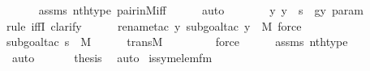 \begin{isabellebody}
\ \ \ \ \isamarkupfalse%
\ assms\ nth{\isacharunderscore}{\kern0pt}type\ pair{\isacharunderscore}{\kern0pt}in{\isacharunderscore}{\kern0pt}M{\isacharunderscore}{\kern0pt}iff\isanewline
\ \ \ \ \isamarkupfalse%
\ auto\isanewline
\ \ \isamarkupfalse%
\ \isamarkupfalse%
\ {\isachardoublequoteopen}{\isachardot}{\kern0pt}{\isachardot}{\kern0pt}{\isachardot}{\kern0pt}\ {\isasymlongleftrightarrow}\ {\isacharparenleft}{\kern0pt}{\isasymforall}y{\isachardot}{\kern0pt}\ y\ {\isasymin}\ s\ {\isasymlongrightarrow}\ g{\isacharbackquote}{\kern0pt}{\isacharless}{\kern0pt}y{\isacharcomma}{\kern0pt}\ param{\isachargreater}{\kern0pt}\ {\isacharequal}{\kern0pt}\ {}{\isacharparenright}{\kern0pt}{\isachardoublequoteclose}\ \isanewline
\ \ \ \ \isamarkupfalse%
{\isacharparenleft}{\kern0pt}rule\ iffI{\isacharcomma}{\kern0pt}\ clarify{\isacharparenright}{\kern0pt}\isanewline
\ \ \ \ \ \isamarkupfalse%
{\isacharparenleft}{\kern0pt}rename{\isacharunderscore}{\kern0pt}tac\ y{\isacharcomma}{\kern0pt}\ subgoal{\isacharunderscore}{\kern0pt}tac\ {\isachardoublequoteopen}y\ {\isasymin}\ M{\isachardoublequoteclose}{\isacharcomma}{\kern0pt}\ force{\isacharparenright}{\kern0pt}\isanewline
\ \ \ \ \ \isamarkupfalse%
{\isacharparenleft}{\kern0pt}subgoal{\isacharunderscore}{\kern0pt}tac\ {\isachardoublequoteopen}s\ {\isasymin}\ M{\isachardoublequoteclose}{\isacharparenright}{\kern0pt}\isanewline
\ \ \ \ \isamarkupfalse%
\ transM\ \isanewline
\ \ \ \ \ \ \isamarkupfalse%
\ force\isanewline
\ \ \ \ \isamarkupfalse%
\ assms\ nth{\isacharunderscore}{\kern0pt}type\ \isanewline
\ \ \ \ \isamarkupfalse%
\ auto\ \isanewline
\ \ \isamarkupfalse%
\ \isamarkupfalse%
\ {\isacharquery}{\kern0pt}thesis\ \isamarkupfalse%
\ auto\isanewline
{}\isamarkupfalse%
%
\endisatagproof
{\isafoldproof}%
%
\isadelimproof
\isanewline
%
\endisadelimproof
\isanewline
{}\isamarkupfalse%
\isanewline
\isanewline
{}\isamarkupfalse%
\ is{\isacharunderscore}{\kern0pt}sym{\isacharunderscore}{\kern0pt}elem{\isacharunderscore}{\kern0pt}fm\ \isanewline

\end{isabellebody}
